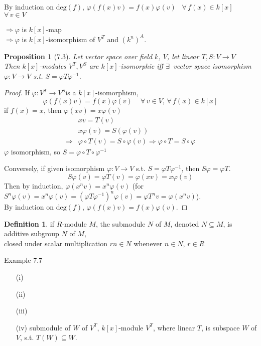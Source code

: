 \documentclass[twoside,landscape]{amsart}
\theoremstyle{plain}
\newtheorem{proposition}{Proposition}
\theoremstyle{definition}
\newtheorem{definition}{Definition}
\theoremstyle{remark}
\begin{document}
\begin{multicols*}{2}
\begin{enumerate}
By induction on $\text{deg}(f)$, $\varphi(f(x)v) = f(x) \varphi(v)$ \quad \, $\forall \, f(x) \in k[x]$ \quad \, $\forall \, v \in V$ 

$\Longrightarrow \varphi$ is $k[x]$-map \\
$\Longrightarrow \varphi$ is $k[x]$-isomorphism of $V^T$ and $(k^n)^A$.  

\end{enumerate}


\begin{proposition}[7.3]
Let vector space over field $k$, $V$, let linear $T,S : V \to V$ \\
Then $k[x]$-modules $V^T, V^S$ are $k[x]$-isomorphic iff $\exists \, $ vector space isomorphism $\varphi : V \to V$ s.t. $S = \varphi T \varphi^{-1}$.  
\end{proposition}

\begin{proof}
If $\varphi:V^T \to V^S$is a $k[x]$-isomorphism, 
\[
\varphi(f(x)v) = f(x)\varphi(v) \quad \, \forall \, v \in V , \, \forall \, f(x) \in k[x]
\]
if $f(x)=x$, then $\varphi(xv) = x\varphi(v)$
\[
\begin{aligned}
  & xv = T(v) \\ 
  & x\varphi(v) = S(\varphi(v)) \\ 
 \Longrightarrow & \varphi \circ T(v) = S \circ \varphi(v) \Longrightarrow \varphi \circ T = S \circ \varphi 
\end{aligned}
\]
$\varphi$ isomorphism, so $S = \varphi \circ T \circ \varphi^{-1}$

Conversely, if given isomorphism $\varphi: V \to V$ s.t. $S = \varphi T \varphi^{-1}$, then $S\varphi = \varphi T$.  
\[
S\varphi(v) = \varphi T(v) = \varphi(xv) = x\varphi(v)
\]
Then by induction, $\varphi(x^nv) = x^n\varphi(v)$ (for $S^n\varphi(v) = x^n\varphi(v) = (\varphi T \varphi^{-1})^n \varphi(v) = \varphi T^n v = \varphi(x^nv)$).  \\
By induction on $\text{deg}(f)$, $\varphi(f(x)v) = f(x)\varphi(v)$.  


\end{proof}

\begin{definition}
  if $R$-module $M$, the submodule $N$ of $M$, denoted $N\subseteq M$, is additive subgroup $N$ of $M$, \\
closed under scalar multiplication $rn \in N$ whenever $n\in N$, $r\in R$
\end{definition}

Example 7.7 
\begin{enumerate}
  \item[(i)]
  \item[(ii)]
  \item[(iii)]
  \item[(iv)] submodule of $W$ of $V^T$, $k[x]$-module $V^T$, where linear $T$, is subspace $W$ of $V$, s.t. $T(W) \subseteq W$.  


\end{enumerate}
\end{multicols*}
\end{document}

